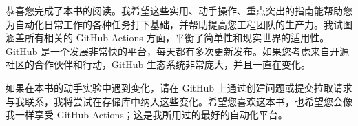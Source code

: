 
恭喜您完成了本书的阅读。我希望这些实用、动手操作、重点突出的指南能帮助您为自动化日常工作的各种任务打下基础，并帮助提高您工程团队的生产力。我试图涵盖所有相关的 GitHub Actions 方面，平衡了简单性和现实世界的适用性。GitHub 是一个发展非常快的平台，每天都有多次更新发布。如果您考虑来自开源社区的合作伙伴和行动，GitHub 生态系统非常庞大，并且一直在变化。

如果在本书的动手实验中遇到变化，请在 GitHub 上通过创建问题或提交拉取请求与我联系，我将尝试在存储库中纳入这些变化。希望您喜欢这本书，也希望您会像我一样享受 GitHub Actions；这是我所用过的最好的自动化平台。










